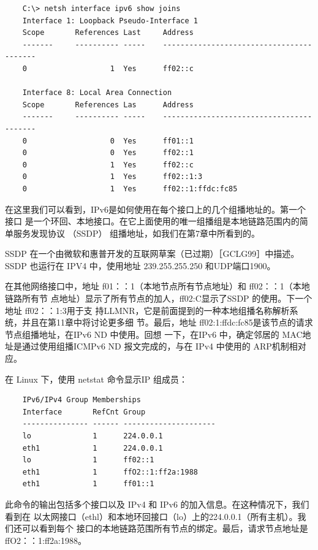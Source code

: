 \begin{verbatim}
    C:\> netsh interface ipv6 show joins
    Interface 1: Loopback Pseudo-Interface 1
    Scope       References Last     Address
    -------     ---------- -----    -----------------------------------------
    0                   1  Yes      ff02::c

    Interface 8: Local Area Connection
    Scope       References Las      Address
    -------     ---------- -----    -----------------------------------------
    0                   0  Yes      ff01::1
    0                   0  Yes      ff02::1
    0                   1  Yes      ff02::c
    0                   1  Yes      ff02::1:3
    0                   1  Yes      ff02::1:ffdc:fc85
\end{verbatim}

在这里我们可以看到，IPv6是如何使用在每个接口上的几个组播地址的。第一个接口
是一个环回、本地接口。在它上面使用的唯一组播组是本地链路范围内的简单服务发现协议
（SSDP） 组播地址，如我们在第7章中所看到的。

\begin{tcolorbox}
  SSDP 在一个由微软和惠普开发的互联网草案（已过期）［GCLG99］中描述。
  SSDP 也运行在 IPV4 中，使用地址 239.255.255.250 和UDP端口1900。
\end{tcolorbox}

在其他网络接口中，地址 f01：：1（本地节点所有节点地址）和 ff02：：1（本地链路所有节
点地址）显示了所有节点的加人，ff02:C显示了SSDP 的使用。下一个地址 ff02：：1:3用于支
持LLMNR，它是前面提到的一种本地组播名称解析系统，并且在第11章中将讨论更多细
节。最后，地址 ff02:1:ffdc:fc85是该节点的请求节点组播地址，在IPv6 ND 中使用。回想
一下，在IPv6 中，确定邻居的 MAC地址是通过使用组播ICMPv6 ND 报文完成的，与在
IPv4 中使用的 ARP机制相对应。

在 Linux 下，使用 netstat 命令显示IP 组成员：

\begin{verbatim}
    IPv6/IPv4 Group Memberships
    Interface       RefCnt Group
    --------------- ------ ---------------------
    lo              1      224.0.0.1
    eth1            1      224.0.0.1
    lo              1      ff02::1
    eth1            1      ffO2::1:ff2a:1988
    eth1            1      ff01::1
\end{verbatim}

此命令的输出包括多个接口以及 IPv4 和 IPv6 的加入信息。在这种情况下，我们看到在
以太网接口（ethl）和本地环回接口（lo）上的224.0.0.1（所有主机）。我们还可以看到每个
接口的本地链路范围所有节点的绑定。最后，请求节点地址是 ffO2：：1:ff2a:1988。

